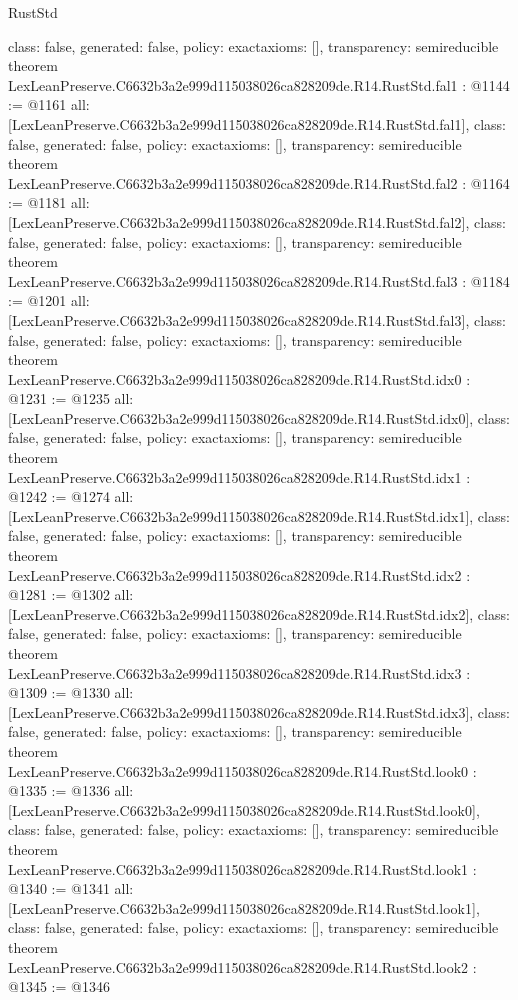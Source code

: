 \begin{lexlean}{RustStd}
\begin{coremodule}
{  class: false,
  generated: false,
  policy: exact{axioms: []},
  transparency: semireducible
}
theorem LexLeanPreserve.C6632b3a2e999d115038026ca828209de.R14.RustStd.fal1 : @1144 := @1161 {
  all: [LexLeanPreserve.C6632b3a2e999d115038026ca828209de.R14.RustStd.fal1],
  class: false,
  generated: false,
  policy: exact{axioms: []},
  transparency: semireducible
}
theorem LexLeanPreserve.C6632b3a2e999d115038026ca828209de.R14.RustStd.fal2 : @1164 := @1181 {
  all: [LexLeanPreserve.C6632b3a2e999d115038026ca828209de.R14.RustStd.fal2],
  class: false,
  generated: false,
  policy: exact{axioms: []},
  transparency: semireducible
}
theorem LexLeanPreserve.C6632b3a2e999d115038026ca828209de.R14.RustStd.fal3 : @1184 := @1201 {
  all: [LexLeanPreserve.C6632b3a2e999d115038026ca828209de.R14.RustStd.fal3],
  class: false,
  generated: false,
  policy: exact{axioms: []},
  transparency: semireducible
}
theorem LexLeanPreserve.C6632b3a2e999d115038026ca828209de.R14.RustStd.idx0 : @1231 := @1235 {
  all: [LexLeanPreserve.C6632b3a2e999d115038026ca828209de.R14.RustStd.idx0],
  class: false,
  generated: false,
  policy: exact{axioms: []},
  transparency: semireducible
}
theorem LexLeanPreserve.C6632b3a2e999d115038026ca828209de.R14.RustStd.idx1 : @1242 := @1274 {
  all: [LexLeanPreserve.C6632b3a2e999d115038026ca828209de.R14.RustStd.idx1],
  class: false,
  generated: false,
  policy: exact{axioms: []},
  transparency: semireducible
}
theorem LexLeanPreserve.C6632b3a2e999d115038026ca828209de.R14.RustStd.idx2 : @1281 := @1302 {
  all: [LexLeanPreserve.C6632b3a2e999d115038026ca828209de.R14.RustStd.idx2],
  class: false,
  generated: false,
  policy: exact{axioms: []},
  transparency: semireducible
}
theorem LexLeanPreserve.C6632b3a2e999d115038026ca828209de.R14.RustStd.idx3 : @1309 := @1330 {
  all: [LexLeanPreserve.C6632b3a2e999d115038026ca828209de.R14.RustStd.idx3],
  class: false,
  generated: false,
  policy: exact{axioms: []},
  transparency: semireducible
}
theorem LexLeanPreserve.C6632b3a2e999d115038026ca828209de.R14.RustStd.look0 : @1335 := @1336 {
  all: [LexLeanPreserve.C6632b3a2e999d115038026ca828209de.R14.RustStd.look0],
  class: false,
  generated: false,
  policy: exact{axioms: []},
  transparency: semireducible
}
theorem LexLeanPreserve.C6632b3a2e999d115038026ca828209de.R14.RustStd.look1 : @1340 := @1341 {
  all: [LexLeanPreserve.C6632b3a2e999d115038026ca828209de.R14.RustStd.look1],
  class: false,
  generated: false,
  policy: exact{axioms: []},
  transparency: semireducible
}
theorem LexLeanPreserve.C6632b3a2e999d115038026ca828209de.R14.RustStd.look2 : @1345 := @1346 {
}
\end{coremodule}
\end{lexlean}
